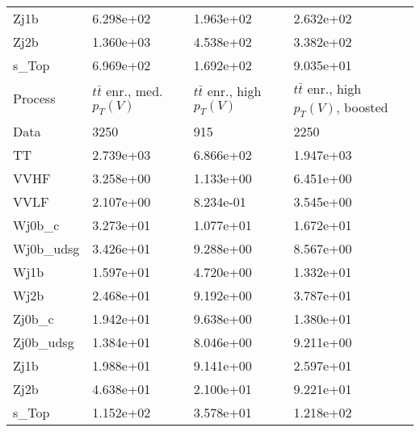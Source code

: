 \begin{table}
{\begin{tabularx}{0.8\textwidth}{|X|X|X|X|}
Zj1b & 6.298e+02 & 1.963e+02 & 2.632e+02 \\
Zj2b & 1.360e+03 & 4.538e+02 & 3.382e+02 \\
s\_Top & 6.969e+02 & 1.692e+02 & 9.035e+01 \\
\hline
\hline
Process & $t\bar{t}$ enr., med. $p_{T}(V)$ & $t\bar{t}$ enr., high $p_{T}(V)$ & $t\bar{t}$ enr., high $p_{T}(V)$, boosted \\
\hline
Data & 3250 & 915 & 2250 \\
\hline
TT & 2.739e+03 & 6.866e+02 & 1.947e+03 \\
VVHF & 3.258e+00 & 1.133e+00 & 6.451e+00 \\
VVLF & 2.107e+00 & 8.234e-01 & 3.545e+00 \\
Wj0b\_c & 3.273e+01 & 1.077e+01 & 1.672e+01 \\
Wj0b\_udsg & 3.426e+01 & 9.288e+00 & 8.567e+00 \\
Wj1b & 1.597e+01 & 4.720e+00 & 1.332e+01 \\
Wj2b & 2.468e+01 & 9.192e+00 & 3.787e+01 \\
Zj0b\_c & 1.942e+01 & 9.638e+00 & 1.380e+01 \\
Zj0b\_udsg & 1.384e+01 & 8.046e+00 & 9.211e+00 \\
Zj1b & 1.988e+01 & 9.141e+00 & 2.597e+01 \\
Zj2b & 4.638e+01 & 2.100e+01 & 9.221e+01 \\
s\_Top & 1.152e+02 & 3.578e+01 & 1.218e+02 \\
\hline
\end{tabularx}
}
\label{tab:cr-Znn-2017}
\end{table}

